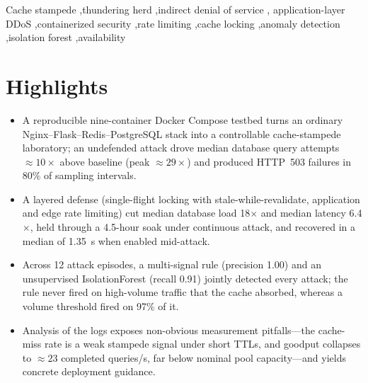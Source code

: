 \documentclass[preprint,12pt]{elsarticle}
\begin{document}
\begin{frontmatter}
\begin{abstract}
caught 12 of 12 attack episodes with one false alarm in 332 normal intervals; the
IsolationForest was fast (median 0.85~s, interval recall 0.91) while the rule was
slower (median 3.2~s, recall 0.27) but perfectly precise and, unlike a volume
threshold that fired on 97\% of absorbed high-volume bursts, never fired on traffic
that the cache absorbed. An ablation and the development history show that cache
locking protects the database but not the proxy path, so edge rate limiting is
required to keep legitimate users fast. We also report measurement caveats uncovered by
the analysis and derive deployment guidance for operators of cached services.
\end{abstract}

\begin{keyword}
Cache stampede \sep thundering herd \sep indirect denial of service \sep
application-layer DDoS \sep containerized security \sep rate limiting \sep cache
locking \sep anomaly detection \sep isolation forest \sep availability
\end{keyword}

\end{frontmatter}

\section*{Highlights}
\begin{itemize}[leftmargin=*]
\item A reproducible nine-container Docker Compose testbed turns an ordinary
Nginx--Flask--Redis--PostgreSQL stack into a controllable cache-stampede laboratory;
an undefended attack drove median database query attempts ${\approx}10\times$ above
baseline (peak ${\approx}29\times$) and produced HTTP~503 failures in 80\% of sampling
intervals.
\item A layered defense (single-flight locking with stale-while-revalidate, application
and edge rate limiting) cut median database load 18$\times$ and median latency
6.4$\times$, held through a 4.5-hour soak under continuous attack, and recovered in a
median of 1.35~s when enabled mid-attack.
\item Across 12 attack episodes, a multi-signal rule (precision 1.00) and an
unsupervised IsolationForest (recall 0.91) jointly detected every attack; the rule
never fired on high-volume traffic that the cache absorbed, whereas a volume threshold
fired on 97\% of it.
\item Analysis of the logs exposes non-obvious measurement pitfalls---the cache-miss
rate is a weak stampede signal under short TTLs, and goodput collapses to
${\approx}23$ completed queries/s, far below nominal pool capacity---and yields concrete
deployment guidance.
\end{itemize}
\end{document}
